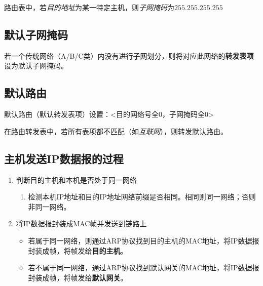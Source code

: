 路由表中，若\textit{目的地址}为某一特定主机，则\textit{子网掩码}为\(255.255.255.255\)


\subsection{默认子网掩码}
若一个传统网络（A/B/C类）内没有进行子网划分，则将对应此网络的\textbf{转发表项}设为默认子网掩码。


\subsection{默认路由}
默认路由（默认转发表项）设置：<目的网络号全0，子网掩码全0>

在路由转发表中，若所有表项都不匹配（如\textit{互联网}），则转发默认路由。


\subsection{主机发送IP数据报的过程}
\begin{enumerate}
    \item 判断目的主机和本机是否处于同一网络\begin{enumerate}
        \item 检测本机IP地址和目的IP地址网络前缀是否相同。相同则同一网络；否则非同一网络。
    \end{enumerate}
    \item 将IP数据报封装成MAC帧并发送到链路上\begin{itemize}
        \item 若属于同一网络，则通过ARP协议找到目的主机的MAC地址，将IP数据报封装成帧，将帧发给\textbf{目的主机}。
        \item 若不属于同一网络，通过ARP协议找到默认网关的MAC地址，将IP数据报封装成帧，将帧发给\textbf{默认网关}。
    \end{itemize}
\end{enumerate}


